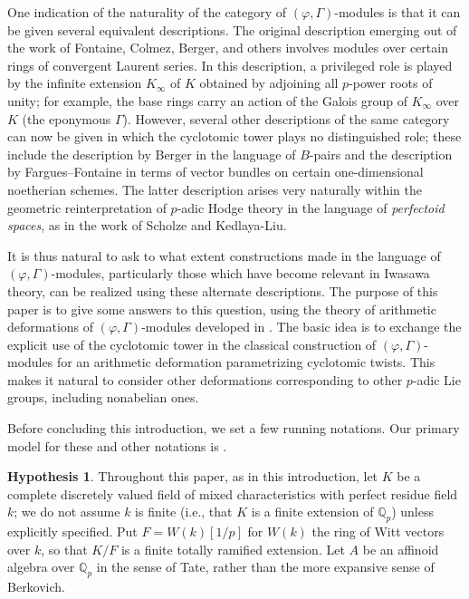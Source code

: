 \documentclass[12pt]{amsart}
\theoremstyle{definition}
\newtheorem{hypothesis}[theorem]{Hypothesis}
\numberwithin{equation}{theorem}
\newcommand{\QQ}{\mathbb{Q}}
\begin{document}
One indication of the naturality of the category of $(\varphi, \Gamma)$-modules is that it can be given several equivalent descriptions. The original description emerging out of the work of Fontaine, Colmez, Berger, and others involves modules over certain rings of convergent Laurent series. In this description, a privileged role is played by the infinite extension $K_\infty$ of $K$ obtained by adjoining all $p$-power roots of unity; for example, the base rings carry an action of the Galois group of $K_\infty$ over $K$ (the eponymous $\Gamma$). However, several other descriptions of the same category can now be given in which the cyclotomic tower plays no distinguished role; these include the description by Berger in the language of $B$-pairs and the description by Fargues--Fontaine in terms of vector bundles on certain one-dimensional noetherian schemes. The latter description arises very naturally within the geometric reinterpretation of $p$-adic Hodge theory in the language of \emph{perfectoid spaces}, as in the work of Scholze and Kedlaya-Liu.

It is thus natural to ask to what extent constructions made in the language of $(\varphi, \Gamma)$-modules, particularly those which have become relevant in Iwasawa theory, can be realized using these alternate descriptions. The purpose of this paper is to give some answers to this question, using the theory of arithmetic deformations of $(\varphi, \Gamma)$-modules developed in \cite{kpx}. The basic idea is to exchange the explicit use of the cyclotomic tower in the classical construction of $(\varphi, \Gamma)$-modules for an arithmetic deformation parametrizing cyclotomic twists. This makes it natural to consider other deformations corresponding to other $p$-adic Lie groups, including nonabelian ones.

Before concluding this introduction, we set a few running notations. Our primary model for these and other notations is \cite{kpx}.
\setcounter{theorem}{0}
\begin{hypothesis}
Throughout this paper, as in this introduction, let $K$ be a complete discretely valued field of mixed characteristics with perfect residue field $k$; we do not assume $k$ is finite (i.e., that $K$ is a finite extension of $\QQ_p$) unless explicitly specified.
Put $F = W(k)[1/p]$ for $W(k)$ the ring of Witt vectors over $k$, so that $K/F$ is a finite totally ramified extension.
Let $A$ be an affinoid algebra over $\QQ_p$ in the sense of Tate, rather than the more expansive sense of Berkovich. 
\end{hypothesis}
\end{document}
